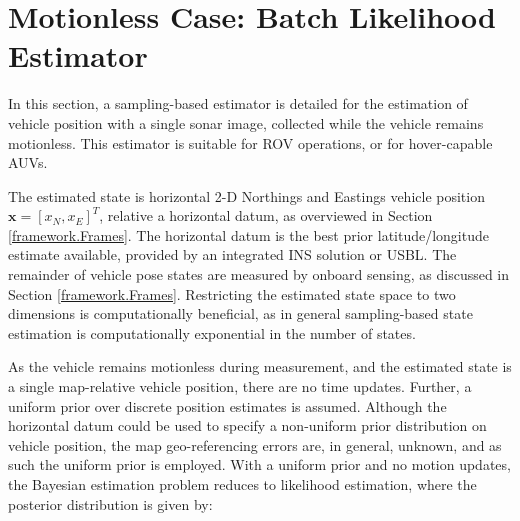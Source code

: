 
\section{Motionless Case: Batch Likelihood Estimator}
\label{framework.Motionless}
%

In this section, a sampling-based estimator is detailed for the estimation of vehicle position with a single sonar image, collected while the vehicle remains motionless.
This estimator is suitable for ROV operations, or for hover-capable AUVs.

The estimated state is horizontal 2-D Northings and Eastings vehicle position $\textbf{x} = [x_{N}, x_{E}]^{T}$, relative a horizontal datum, as overviewed in Section \ref{framework.Frames}.
The horizontal datum is the best prior latitude/longitude estimate available, provided by an integrated INS solution or USBL.
The remainder of vehicle pose states are measured by onboard sensing, as discussed in Section \ref{framework.Frames}.
Restricting the estimated state space to two dimensions is computationally beneficial, as in general sampling-based state estimation is computationally exponential in the number of states.

As the vehicle remains motionless during measurement, and the estimated state is a single map-relative vehicle position, there are no time updates.
Further, a uniform prior over discrete position estimates is assumed.
Although the horizontal datum could be used to specify a non-uniform prior distribution on vehicle position, the map geo-referencing errors are, in general, unknown, and as such the uniform prior is employed.
With a uniform prior and no motion updates, the Bayesian estimation problem reduces to likelihood estimation, where the posterior distribution is given by:

